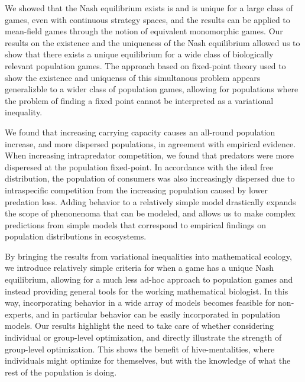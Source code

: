 We showed that the Nash equilibrium exists is and is unique for a large class of games, even with continuous strategy spaces, and the results can be applied to mean-field games through the notion of equivalent monomorphic games. Our results on the existence and the uniqueness of the Nash equilibrium allowed us to show that there exists a unique equilibrium for a wide class of biologically relevant population games. The approach based on fixed-point theory used to show the existence and uniquenss of this simultanous problem appears generalizble to a wider class of population games, allowing for populations where the problem of finding a fixed point cannot be interpreted as a variational inequality.


We found that increasing carrying capacity causes an all-round population increase, and more dispersed populations, in agreement with empirical evidence. When increasing intrapredator competition, we found that predators were more disperesed at the population fixed-point. In accordance with the ideal free distribution, the population of consumers was also increasingly dispersed due to intraspecific competition from the increasing population caused by lower predation loss. Adding behavior to a relatively simple model drastically expands the scope of phenonenoma that can be modeled, and allows us to make complex predictions from simple models that correspond to empirical findings on population distributions in ecosystems.


By bringing the results from variational inequalities into mathematical ecology, we introduce relatively simple criteria for when a game has a unique Nash equilibrium, allowing for a much less ad-hoc approach to population games and instead providing general tools for the working mathematical biologist. In this way, incorporating behavior in a wide array of models becomes feasible for non-experts, and in particular behavior can be easily incorporated in population models. Our results highlight the need to take care of whether considering individual or group-level optimization, and directly illustrate the strength of group-level optimization. This shows the benefit of hive-mentalities, where individuals might optimize for themselves, but with the knowledge of what the rest of the population is doing.

